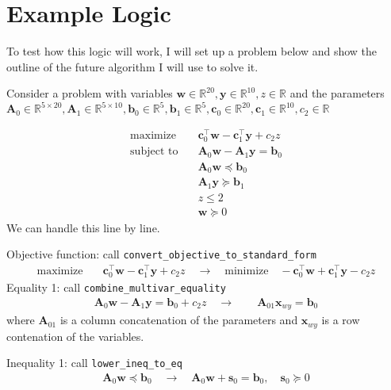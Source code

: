 \documentclass[11pt]{article}
\begin{document}
\section{Example Logic}
To test how this logic will work, I will set up a problem below and show the outline of the future algorithm I will use to solve it.

Consider a problem with variables $\textbf{w} \in \mathbb{R}^{20}, \textbf{y} \in \mathbb{R}^{10}, z \in \mathbb{R}$
and the parameters $\textbf{A}_0 \in \mathbb{R}^{5 \times 20},\textbf{A}_1 \in \mathbb{R}^{5 \times 10}, \textbf{b}_0 \in \mathbb{R}^5, \textbf{b}_1 \in \mathbb{R}^5, \textbf{c}_0 \in \mathbb{R}^{20}, \textbf{c}_1 \in \mathbb{R}^{10}, c_2 \in \mathbb{R}$

\begin{align}
  \text{maximize} & \quad \textbf{c}_0^\top \textbf{w} - \textbf{c}_1^\top \textbf{y} + c_2 z \\
  \text{subject to} & \quad \textbf{A}_0 \textbf{w} - \textbf{A}_1 \textbf{y} =  \textbf{b}_0 \\
  & \quad \textbf{A}_0 \textbf{w} \preceq \textbf{b}_0 \\
  & \quad \textbf{A}_1 \textbf{y} \succeq \textbf{b}_1 \\
  & \quad z \leq 2 \\ 
  & \quad \textbf{w} \succeq 0 
\end{align}
We can handle this line by line.

Objective function: call \texttt{convert\_objective\_to\_standard\_form}
\begin{align}
    \text{maximize} & \quad \textbf{c}_0^\top \textbf{w} - \textbf{c}_1^\top \textbf{y} + c_2 z \quad \to \quad \text{minimize} \quad -\textbf{c}_0^\top \textbf{w} + \textbf{c}_1^\top \textbf{y} - c_2 z 
\end{align}
Equality 1: call \texttt{combine\_multivar\_equality}
\begin{align}
    \textbf{A}_0 \textbf{w} - \textbf{A}_1 \textbf{y} =  \textbf{b}_0 + c_2 z \quad \to \quad \quad \textbf{A}_{01} \textbf{x}_{wy}  =  \textbf{b}_0
\end{align}
where $\textbf{A}_{01}$ is a column concatenation of the parameters and $\textbf{x}_{wy}$ is a row contenation of the variables.

Inequality 1: call \texttt{lower\_ineq\_to\_eq}
\begin{align}
    \textbf{A}_0 \textbf{w} \preceq \textbf{b}_0 \quad \to \quad \textbf{A}_0 \textbf{w} + \textbf{s}_0 = \textbf{b}_0, \quad \textbf{s}_0 \succeq 0
\end{align}
\end{document}
